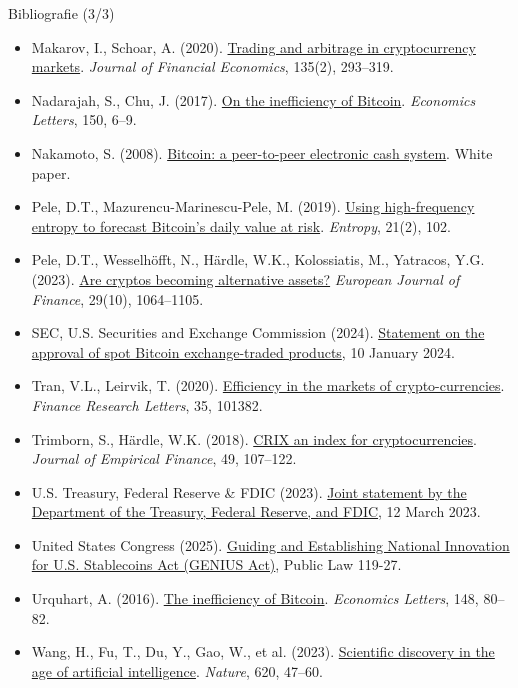 \begin{frame}{Bibliografie (3/3)}
\itemsize{\tiny}
\begin{itemize}
    \item Makarov, I., Schoar, A. (2020). \href{https://doi.org/10.1016/j.jfineco.2019.07.001}{Trading and arbitrage in cryptocurrency markets}. \textit{Journal of Financial Economics}, 135(2), 293--319.
    \item Nadarajah, S., Chu, J. (2017). \href{https://doi.org/10.1016/j.econlet.2016.10.033}{On the inefficiency of Bitcoin}. \textit{Economics Letters}, 150, 6--9.
    \item Nakamoto, S. (2008). \href{https://bitcoin.org/bitcoin.pdf}{Bitcoin: a peer-to-peer electronic cash system}. White paper.
    \item Pele, D.T., Mazurencu-Marinescu-Pele, M. (2019). \href{https://doi.org/10.3390/e21020102}{Using high-frequency entropy to forecast Bitcoin's daily value at risk}. \textit{Entropy}, 21(2), 102.
    \item Pele, D.T., Wesselhöfft, N., Härdle, W.K., Kolossiatis, M., Yatracos, Y.G. (2023). \href{https://doi.org/10.1080/1351847X.2021.1960403}{Are cryptos becoming alternative assets?} \textit{European Journal of Finance}, 29(10), 1064--1105.
    \item SEC, U.S. Securities and Exchange Commission (2024). \href{https://www.sec.gov/newsroom/speeches-statements/gensler-statement-spot-bitcoin-011023}{Statement on the approval of spot Bitcoin exchange-traded products}, 10 January 2024.
    \item Tran, V.L., Leirvik, T. (2020). \href{https://doi.org/10.1016/j.frl.2019.101382}{Efficiency in the markets of crypto-currencies}. \textit{Finance Research Letters}, 35, 101382.
    \item Trimborn, S., Härdle, W.K. (2018). \href{https://doi.org/10.1016/j.jempfin.2018.08.004}{CRIX an index for cryptocurrencies}. \textit{Journal of Empirical Finance}, 49, 107--122.
    \item U.S. Treasury, Federal Reserve \& FDIC (2023). \href{https://www.federalreserve.gov/newsevents/pressreleases/monetary20230312b.htm}{Joint statement by the Department of the Treasury, Federal Reserve, and FDIC}, 12 March 2023.
    \item United States Congress (2025). \href{https://www.govinfo.gov/app/details/PLAW-119publ27}{Guiding and Establishing National Innovation for U.S. Stablecoins Act (GENIUS Act)}, Public Law 119-27.
    \item Urquhart, A. (2016). \href{https://doi.org/10.1016/j.econlet.2016.09.019}{The inefficiency of Bitcoin}. \textit{Economics Letters}, 148, 80--82.
    \item Wang, H., Fu, T., Du, Y., Gao, W., et al. (2023). \href{https://doi.org/10.1038/s41586-023-06221-2}{Scientific discovery in the age of artificial intelligence}. \textit{Nature}, 620, 47--60.
\end{itemize}
\end{frame}


